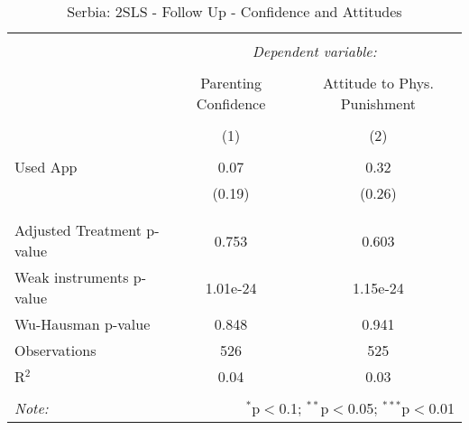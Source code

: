 
\begin{table}[!htbp] \centering 
  \caption{Serbia: 2SLS - Follow Up - Confidence and Attitudes} 
  \label{tbl:Serbia: 2SLS - Follow Up - Confidence and Attitudes} 
\begin{tabular}{@{\extracolsep{5pt}}lcc} 
\\[-1.8ex]\hline 
\hline \\[-1.8ex] 
 & \multicolumn{2}{c}{\textit{Dependent variable:}} \\ 
\cline{2-3} 
\\[-1.8ex] & Parenting Confidence & Attitude to Phys. Punishment \\ 
\\[-1.8ex] & (1) & (2)\\ 
\hline \\[-1.8ex] 
 Used App & 0.07 & 0.32 \\ 
  & (0.19) & (0.26) \\ 
  & & \\ 
\hline \\[-1.8ex] 
Adjusted Treatment p-value & 0.753 & 0.603 \\ 
Weak instruments p-value & 1.01e-24 & 1.15e-24 \\ 
Wu-Hausman p-value & 0.848 & 0.941 \\ 
Observations & 526 & 525 \\ 
R$^{2}$ & 0.04 & 0.03 \\ 
\hline 
\hline \\[-1.8ex] 
\textit{Note:}  & \multicolumn{2}{r}{$^{*}$p$<$0.1; $^{**}$p$<$0.05; $^{***}$p$<$0.01} \\ 
\end{tabular} 
\end{table} 
